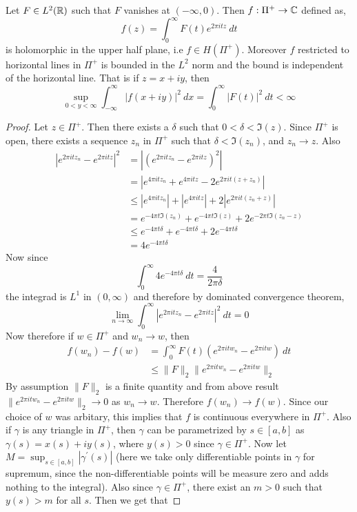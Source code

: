 \begin{proposition}
  \label{prop:fourier_transform_in_upper_half_plane}
  Let $F\in L^2(\mathbb R)$ such that $F$ vanishes at $(-\infty , 0)$. Then $f : \Pi^+ \to \mathbb C$ defined as, $$f(z) = \int_0^\infty F(t) e^{2\pi itz} \ dt$$
  is holomorphic in the upper half plane, i.e $f \in H(\Pi^+)$. Moreover $f$ restricted to horizontal lines in $\Pi^+$ is bounded in the  $L^2$ norm and the bound is independent of the horizontal line. That is if $z = x+iy$, then $$\sup_{0<y<\infty}\int_{-\infty}^\infty \left|f(x + iy)\right|^2 \ dx = \int_0^\infty |F(t)|^2 \ dt < \infty$$
\end{proposition}
\begin{proof}
  Let $z \in \Pi^+$. Then there exists a $\delta$ such that $0< \delta < \Im(z)$. Since $\Pi^+$ is open, there exists a sequence $z_n$ in $\Pi^+$ such that $\delta < \Im(z_n)$, and  $z_n \to z$. Also 
  \begin{align*}
    \left|e^{2 \pi itz_n} - e^{2\pi itz}\right|^2 &= \left|\left(e^{2\pi it z_n} - e^{2\pi itz}\right)^2\right| \\ 
    &= \left| e^{4\pi itz_n} + e^{4\pi itz} - 2e^{2\pi it(z+z_n)} \right| \\
    &\le \left|e^{4\pi itz_n}\right| + \left|e^{4\pi itz}\right| + 2\left|e^{2\pi it(z_n + z)}\right| \\
    &= e^{-4\pi t \Im(z_n)} + e^{-4 \pi t \Im(z)} + 2e^{-2\pi t \Im(z_n - z)} \\
    &\le e^{-4\pi t \delta} + e^{-4\pi t \delta} + 2e^{-4 \pi t\delta} \\
    &=4e^{-4\pi t \delta}
  \end{align*}
  Now since $$\int_0^\infty 4e^{-4\pi t\delta} \ dt = \frac{4}{2\pi \delta}$$
  the integrad is $L^1$ in $(0, \infty)$ and therefore by dominated convergence theorem, $$\lim_{n \to \infty} \int_0^\infty \left|e^{2\pi itz_n} - e^{2\pi itz}\right|^2 \ dt = 0$$
  Now therefore if $w \in \Pi^+$ and $w_n \to w$, then 
  \begin{align*}
    f(w_n) - f(w) &= \int_0^\infty F(t)(e^{2\pi it w_n} - e^{2\pi i tw}) \ dt \\
    & \le \|F\|_2 \|e^{2\pi itw_n} - e^{2\pi itw}\|_2
  \end{align*}
  By assumption $\|F\|_2$ is a finite quantity and from above result $\|e^{2\pi itw_n} - e^{2\pi itw}\|_2 \to 0$ as $w_n \to w$. Therefore $f(w_n) \to f(w)$. Since our choice of $w$ was arbitary, this implies that $f$ is continuous everywhere in $\Pi^+$. Also if $\gamma$ is any triangle in $\Pi^+$, then $\gamma$ can be parametrized by $s \in [a, b]$ as $\gamma(s) = x(s) + iy(s)$, where $y(s) >0$ since $\gamma \in \Pi^+$. Now let $M = \sup_{s \in [a,b]} |\gamma^{'}(s)|$ (here we take only differentiable points in $\gamma$ for supremum, since the non-differentiable points will be measure zero and adds nothing to the integral). Also since $\gamma \in \Pi^+$, there exist an $m >0$ such that $y(s) > m$ for all $s$. Then we get that

\end{proof}
